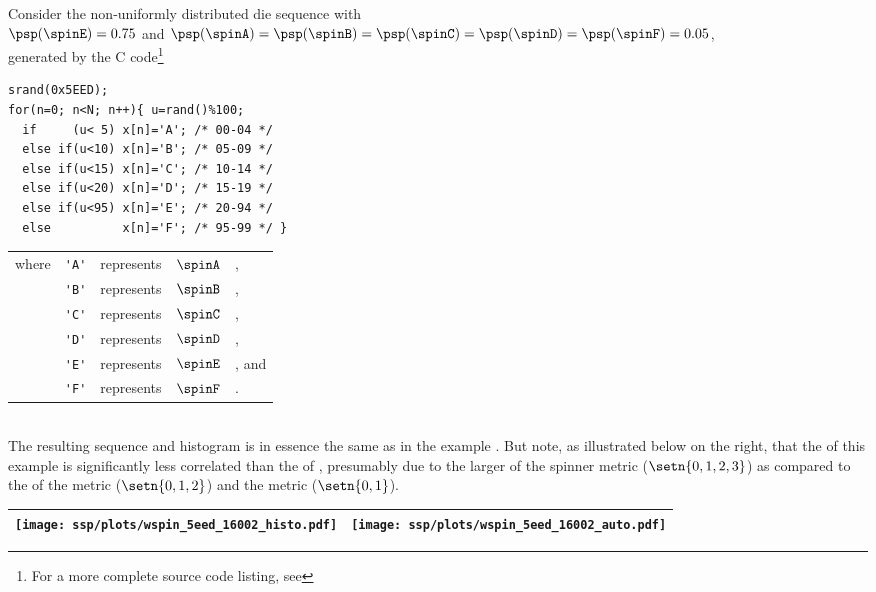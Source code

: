 \begin{example}
\label{ex:wspin_sha}
Consider the non-uniformly distributed die sequence with 
    \\\indentx$\psp(\spinE)=0.75$ and $\psp(\spinA)=\psp(\spinB)=\psp(\spinC)=\psp(\spinD)=\psp(\spinF)=0.05$,\\
    generated by the C code\footnote{For a more complete source code listing, see }
\\\begin{minipage}{85mm}%
\begin{lstlisting}
srand(0x5EED);
for(n=0; n<N; n++){ u=rand()%100;
  if     (u< 5) x[n]='A'; /* 00-04 */ 
  else if(u<10) x[n]='B'; /* 05-09 */ 
  else if(u<15) x[n]='C'; /* 10-14 */ 
  else if(u<20) x[n]='D'; /* 15-19 */ 
  else if(u<95) x[n]='E'; /* 20-94 */ 
  else          x[n]='F'; /* 95-99 */ }
\end{lstlisting}
\end{minipage}%
\hspace{10mm}%
\begin{tabular}{lclcl}
  where & \lstinline!'A'! &represents& $\spinA$ &,
     \\ & \lstinline!'B'! &represents& $\spinB$ &,
     \\ & \lstinline!'C'! &represents& $\spinC$ &,
     \\ & \lstinline!'D'! &represents& $\spinD$ &,
     \\ & \lstinline!'E'! &represents& $\spinE$ &, and
     \\ & \lstinline!'F'! &represents& $\spinF$ &.
\end{tabular}
\\
  The resulting sequence and histogram is in essence the same as in %
  the  example .
  But note, as illustrated below on the right, that the  of this example is 
  significantly less correlated than the  of ,
  presumably due to the larger   of the spinner metric ($\setn{0,1,2,3}$)
  as compared to the  of the  metric ($\setn{0,1,2}$) and 
  the  metric ($\setn{0,1}$).
     \\\begin{tabular}{|>{\scs}c|>{\scs}c|}
          \hline
          \texttt{[image: ssp/plots/wspin\_5eed\_16002\_histo.pdf]}%
         &\texttt{[image: ssp/plots/wspin\_5eed\_16002\_auto.pdf]}
        \\\hline
     \end{tabular}
\end{example}


